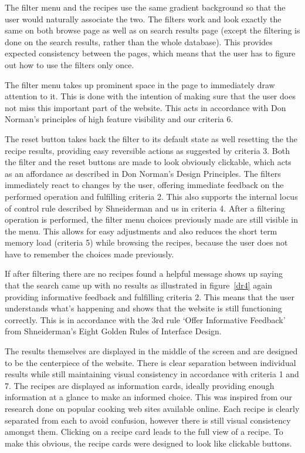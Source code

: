 The filter menu and the recipes use the same gradient background so that the user would naturally associate the two. The filters work and look exactly the same on both browse page as well as on search results page (except the filtering is done on the search results, rather than the whole database). This provides expected consistency between the pages, which means that the user has to figure out how to use the filters only once.

The filter menu takes up prominent space in the page to immediately draw attention to it. This is done with the intention of making sure that the user does not miss this important part of the website. This acts in accordance with Don Norman’s principles of high feature visibility and our criteria 6.

The reset button takes back the filter to its default state as well resetting the the recipe results, providing easy reversible actions as suggested by criteria 3. Both the filter and the reset buttons are made to look obviously clickable, which acts as an affordance as described in Don Norman’s Design Principles. The filters immediately react to changes by the user, offering immediate feedback on the performed operation and fulfilling criteria 2. This also supports the internal locus of control rule described by Shneiderman and us in criteria 4. After a filtering operation is performed, the filter menu choices previously made are still visible in the menu. This allows for easy adjustments and also reduces the short term memory load (criteria 5) while browsing the recipes, because the user does not have to remember the choices made previously.

If after filtering there are no recipes found a helpful message shows up saying that the search came up with no results as illustrated in figure~\ref{dr4} again providing informative feedback and fulfilling criteria 2. This means that the user understands what’s happening and shows that the website is still functioning correctly. This is in accordance with the 3rd rule ‘Offer Informative Feedback’ from  Shneiderman’s Eight Golden Rules of Interface Design. 

The results themselves are displayed in the middle of the screen and are designed to be the centerpiece of the website. There is clear separation between individual results while still maintaining visual consistency in accordance with criteria 1 and 7. The recipes are displayed as information cards, ideally providing enough information at a glance to make an informed choice. This was inspired from our research done on popular cooking web sites available online. Each recipe is clearly separated from each to avoid confusion, however there is still visual consistency amongst them. Clicking on a recipe card leads to the full view of a recipe. To make this obvious, the recipe cards were designed to look like clickable buttons.
